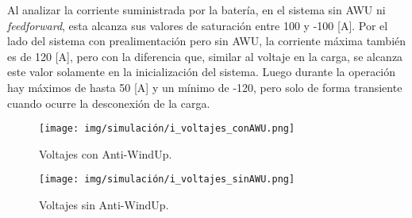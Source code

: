 Al analizar la corriente suministrada por la batería, en el sistema sin AWU ni \textit{feedforward}, esta alcanza sus
valores de saturación entre 100 y -100 [A]. Por el lado del sistema con prealimentación pero sin AWU, la corriente máxima
también es de 120 [A], pero con la diferencia que, similar al voltaje en la carga, se alcanza este valor solamente en
la inicialización del sistema. Luego durante la operación hay máximos de hasta 50 [A] y un mínimo de -120, pero solo de forma 
transiente cuando ocurre la desconexión de la carga.


\begin{figure}[H]
    \centering
    \texttt{[image: img/simulación/i\_voltajes\_conAWU.png]}
    \caption{Voltajes con Anti-WindUp.}
    \label{fig:i_voltajes_conAWU}
\end{figure}

\begin{figure}[H]
    \centering
    \texttt{[image: img/simulación/i\_voltajes\_sinAWU.png]}
    \caption{Voltajes sin Anti-WindUp.}
    \label{fig:i_voltajes_sinAWU}
\end{figure}

\newpage